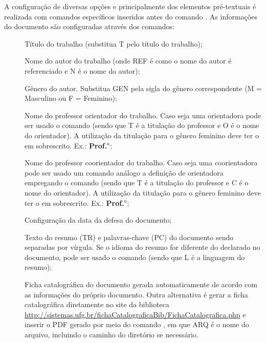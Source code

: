 A configuração de diversas opções e principalmente dos elementos pré-textuais é realizada com comandos específicos inseridos antes do comando . As informações do documento são configuradas através dos comandos:

\begin{description}

 \item[] Título do trabalho (substitua T pelo título do trabalho);
 
 \item[] Nome do autor do trabalho (onde REF é como o nome do autor é referenciado e N é o nome do autor);
 
  \item[] Gênero do autor. Substitua GEN pela sigla do gênero correspondente (M = Masculino ou F = Feminino);

 \item[] Nome do professor orientador do trabalho. Caso seja uma orientadora pode ser usado o comando  (sendo que T é a titulação do professor e O é o nome do orientador). A utilização da titulação para o gênero feminino deve ter o  em sobrescrito. Ex.: \textbf{Prof.$^a$};

 \item[] Nome do professor coorientador do trabalho. Caso seja uma coorientadora pode ser usado um comando análogo a definição de orientadora  empregando o comando (sendo que T é a titulação do professor e C é o nome do orientador). A utilização da titulação para o gênero feminino deve ter o  em sobrescrito. Ex.: \textbf{Prof.$^a$};
 
 \item[] Configuração da data da defesa do documento;

 \item[] Texto do resumo (TR) e palavras-chave (PC) do documento sendo separadas por vírgula. Se o idioma do resumo for diferente do declarado no documento, pode ser usado o comando  (sendo que L é a linguagem do resumo);
 
 \item[] Ficha catalográfica do documento gerada automaticamente de acordo com as informações do próprio documento. Outra alternativa é gerar a ficha catalográfica diretamente no site da biblioteca \url{http://sistemas.ufg.br/fichaCatalograficaBib/FichaCatalografica.php} e inserir o PDF gerado por meio do comando , em que ARQ é o nome do arquivo, incluindo o caminho do diretório se necessário.

 
\end{description}

